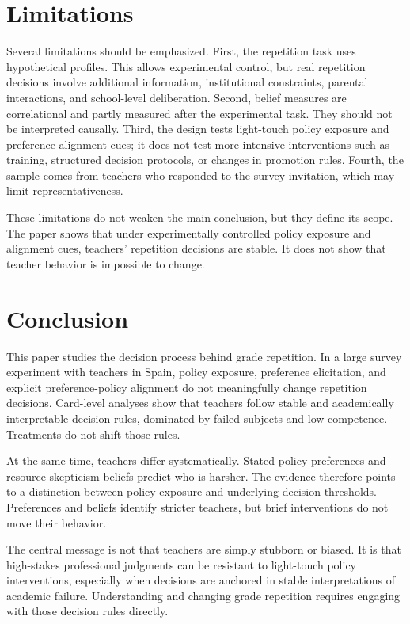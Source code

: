 \documentclass[12pt,a4paper]{article}
\begin{document}
\section{Limitations}

Several limitations should be emphasized. First, the repetition task uses hypothetical profiles. This allows experimental control, but real repetition decisions involve additional information, institutional constraints, parental interactions, and school-level deliberation. Second, belief measures are correlational and partly measured after the experimental task. They should not be interpreted causally. Third, the design tests light-touch policy exposure and preference-alignment cues; it does not test more intensive interventions such as training, structured decision protocols, or changes in promotion rules. Fourth, the sample comes from teachers who responded to the survey invitation, which may limit representativeness.

These limitations do not weaken the main conclusion, but they define its scope. The paper shows that under experimentally controlled policy exposure and alignment cues, teachers' repetition decisions are stable. It does not show that teacher behavior is impossible to change.

\section{Conclusion}

This paper studies the decision process behind grade repetition. In a large survey experiment with teachers in Spain, policy exposure, preference elicitation, and explicit preference-policy alignment do not meaningfully change repetition decisions. Card-level analyses show that teachers follow stable and academically interpretable decision rules, dominated by failed subjects and low competence. Treatments do not shift those rules.

At the same time, teachers differ systematically. Stated policy preferences and resource-skepticism beliefs predict who is harsher. The evidence therefore points to a distinction between policy exposure and underlying decision thresholds. Preferences and beliefs identify stricter teachers, but brief interventions do not move their behavior.

The central message is not that teachers are simply stubborn or biased. It is that high-stakes professional judgments can be resistant to light-touch policy interventions, especially when decisions are anchored in stable interpretations of academic failure. Understanding and changing grade repetition requires engaging with those decision rules directly.
\end{document}
